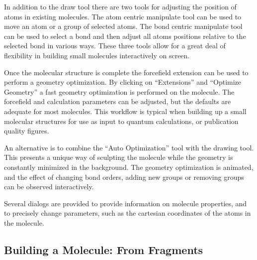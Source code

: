 \documentclass{article}
\begin{document}
In addition to the draw tool there are two tools for adjusting the position of atoms in existing molecules. The atom centric manipulate tool can be used to move an atom or a group of selected atoms. The bond centric manipulate tool can be used to select a bond and then adjust all atoms positions relative to the selected bond in various ways. These three tools allow for a great deal of flexibility in building small molecules interactively on screen.

Once the molecular structure is complete the forcefield extension can be used to perform a geometry optimization. By clicking on ``Extensions'' and ``Optimize Geometry'' a fast geometry optimization is performed on the molecule. The forcefield and calculation parameters can be adjusted, but the defaults are adequate for most molecules. This workflow is typical when building up a small molecular structures for use as input to quantum calculations, or publication quality figures.

An alternative is to combine the ``Auto Optimization'' tool with the drawing tool. This presents a unique way of sculpting the molecule while the geometry is constantly minimized in the background. The geometry optimization is animated, and the effect of changing bond orders, adding new groups or removing groups can be observed interactively.

Several dialogs are provided to provide information on molecule properties, and to precisely change parameters, such as the cartesian coordinates of the atoms in the molecule.

\subsection{Building a Molecule: From Fragments} %
\end{document}

